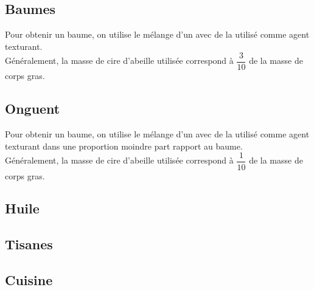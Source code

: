 \subsection{Baumes}

\begin{Defi}[Baume]
    Pour obtenir un baume, on utilise le mélange d'un  avec de la  utilisé comme agent texturant.\\

    Généralement, la masse de cire d'abeille utilisée correspond à $\dfrac{3}{10}$ de la masse de corps gras. 
\end{Defi}



\subsection{Onguent}

\begin{Defi}[Onguent]
    Pour obtenir un baume, on utilise le mélange d'un  avec de la  utilisé comme agent texturant dans une proportion moindre part rapport au baume.\\

    Généralement, la masse de cire d'abeille utilisée correspond à $\dfrac{1}{10}$ de la masse de corps gras. 
\end{Defi}

\subsection{Huile}

\subsection{Tisanes}

\subsection{Cuisine}

